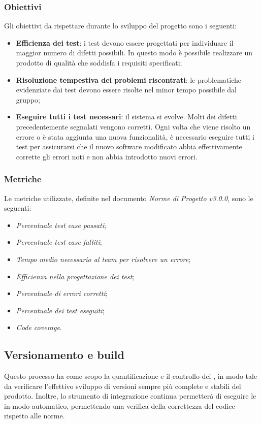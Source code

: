 \subsubsection{Obiettivi} 
Gli obiettivi da rispettare durante lo sviluppo del progetto sono i seguenti:
\begin{itemize}
	\item{\textbf{Efficienza dei test}: i test devono essere progettati per individuare il maggior numero di difetti possibili. In questo modo è possibile realizzare un prodotto di qualità che soddisfa i requisiti specificati;}
	\item{\textbf{Risoluzione tempestiva dei problemi riscontrati}: le problematiche evidenziate dai test devono essere risolte nel minor tempo possibile dal gruppo;}
	\item{\textbf{Eseguire tutti i test necessari}: il sistema si evolve. Molti dei difetti precedentemente segnalati vengono corretti. Ogni volta che viene risolto un errore o è stata aggiunta una nuova funzionalità, è necessario eseguire tutti i test per assicurarsi che il nuovo software modificato abbia effettivamente corrette gli errori noti e non abbia introdotto nuovi errori.}
\end{itemize}
\subsubsection{Metriche}
Le metriche utilizzate, definite nel documento \emph{Norme di Progetto v3.0.0}, sono le seguenti:
\begin{itemize}
	\item{\emph{Percentuale test case passati};}
	\item{\emph{Percentuale test case falliti};}
	\item{\emph{Tempo medio necessario al team per risolvere un errore};}
	\item{\emph{Efficienza nella progettazione dei test};}
	\item{\emph{Percentuale di errori corretti};}
	\item{\emph{Percentuale dei test eseguiti};}
	\item{\emph{Code coverage}.}

\end{itemize}

\subsection{Versionamento e build} 
Questo processo ha come scopo la quantificazione e il controllo dei , in modo tale da verificare l'effettivo sviluppo di versioni sempre più complete e stabili del prodotto. Inoltre, lo strumento di integrazione continua  permetterà di eseguire le  in modo automatico, permettendo una verifica della correttezza del codice rispetto alle norme.
